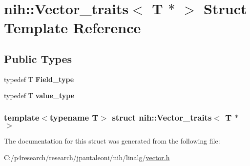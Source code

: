 \hypertarget{structnih_1_1_vector__traits_3_01_t_01_5_01_4}{
\section{nih\-:\-:\-Vector\-\_\-traits$<$ \-T $\ast$ $>$ \-Struct \-Template \-Reference}
\label{structnih_1_1_vector__traits_3_01_t_01_5_01_4}
}
\subsection*{\-Public \-Types}
\begin{DoxyCompactItemize}
\item 
\hypertarget{structnih_1_1_vector__traits_3_01_t_01_5_01_4_a6bfe1eea5ed32e84e1d30ef20ccc82f6}{
typedef \-T {\bfseries \-Field\-\_\-type}}
\label{structnih_1_1_vector__traits_3_01_t_01_5_01_4_a6bfe1eea5ed32e84e1d30ef20ccc82f6}

\item 
\hypertarget{structnih_1_1_vector__traits_3_01_t_01_5_01_4_a8dfbeedbcfe6ce8886e4cbd0ecb14772}{
typedef \-T {\bfseries value\-\_\-type}}
\label{structnih_1_1_vector__traits_3_01_t_01_5_01_4_a8dfbeedbcfe6ce8886e4cbd0ecb14772}

\end{DoxyCompactItemize}
\subsubsection*{template$<$typename T$>$ struct nih\-::\-Vector\-\_\-traits$<$ T $\ast$ $>$}



\-The documentation for this struct was generated from the following file\-:\begin{DoxyCompactItemize}
\item 
\-C\-:/p4research/research/jpantaleoni/nih/linalg/\hyperlink{vector_8h}{vector.\-h}\end{DoxyCompactItemize}
